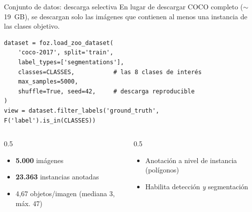 \documentclass[aspectratio=169,11pt]{beamer}
\begin{document}
\begin{frame}[fragile]{Conjunto de datos: descarga selectiva}
  En lugar de descargar COCO completo ($\sim$19~GB), se descargan solo las imágenes que
  contienen al menos una instancia de las clases objetivo.

  \vspace{0.5em}
\begin{lstlisting}[style=py]
dataset = foz.load_zoo_dataset(
    'coco-2017', split='train',
    label_types=['segmentations'],
    classes=CLASSES,           # las 8 clases de interés
    max_samples=5000,
    shuffle=True, seed=42,     # descarga reproducible
)
view = dataset.filter_labels('ground_truth', F('label').is_in(CLASSES))
\end{lstlisting}

  \vspace{0.5em}
  \begin{columns}
    \begin{column}{0.5\textwidth}
      \begin{itemize}\footnotesize
        \item \textbf{5.000} imágenes
        \item \textbf{23.363} instancias anotadas
        \item 4,67 objetos/imagen (mediana 3, máx. 47)
      \end{itemize}
    \end{column}
    \begin{column}{0.5\textwidth}
      \begin{itemize}\footnotesize
        \item Anotación a nivel de instancia (polígonos)
        \item Habilita detección \emph{y} segmentación
      \end{itemize}
    \end{column}
  \end{columns}
\end{frame}
\end{document}
